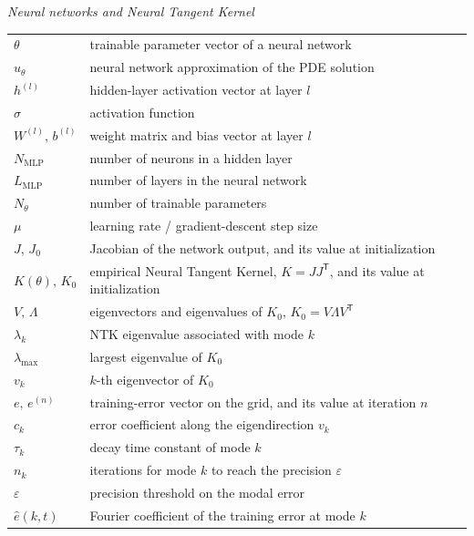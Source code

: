 \vspace{0.5cm}
\noindent\textit{Neural networks and Neural Tangent Kernel}\\[2pt]
\noindent
\begin{tabular}{@{}p{3.4cm}p{12cm}@{}}
    $\theta$         & trainable parameter vector of a neural network \\[2pt]
    $u_{\theta}$     & neural network approximation of the PDE solution \\[2pt]
    $h^{(l)}$        & hidden-layer activation vector at layer $l$ \\[2pt]
    $\sigma$         & activation function \\[2pt]
    $W^{(l)},\,b^{(l)}$ & weight matrix and bias vector at layer $l$ \\[2pt]
    $N_{\mathrm{MLP}}$ & number of neurons in a hidden layer \\[2pt]
    $L_{\mathrm{MLP}}$ & number of layers in the neural network \\[2pt]
    $N_{\theta}$     & number of trainable parameters \\[2pt]
    $\mu$            & learning rate / gradient-descent step size \\[2pt]
    $J,\,J_0$        & Jacobian of the network output, and its value at initialization \\[2pt]
    $K(\theta),\,K_0$ & empirical Neural Tangent Kernel, $K = J J^{\mathsf{T}}$, and its value at initialization \\[2pt]
    $V,\,\Lambda$    & eigenvectors and eigenvalues of $K_0$, $K_0 = V \Lambda V^{\mathsf{T}}$ \\[2pt]
    $\lambda_k$      & NTK eigenvalue associated with mode $k$ \\[2pt]
    $\lambda_{\max}$ & largest eigenvalue of $K_0$ \\[2pt]
    $v_k$            & $k$-th eigenvector of $K_0$ \\[2pt]
    $e,\,e^{(n)}$    & training-error vector on the grid, and its value at iteration $n$ \\[2pt]
    $c_k$            & error coefficient along the eigendirection $v_k$ \\[2pt]
    $\tau_k$         & decay time constant of mode $k$ \\[2pt]
    $n_k$            & iterations for mode $k$ to reach the precision $\varepsilon$ \\[2pt]
    $\varepsilon$    & precision threshold on the modal error \\[2pt]
    $\hat{e}(k,t)$   & Fourier coefficient of the training error at mode $k$ \\
\end{tabular}

